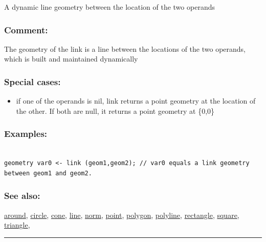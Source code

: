 \documentclass[]{book}
\providecommand{\tightlist}{%
  \setlength{\itemsep}{0pt}\setlength{\parskip}{0pt}}
\theoremstyle{definition}
\theoremstyle{definition}
\theoremstyle{definition}
\theoremstyle{remark}
\begin{document}
A dynamic line geometry between the location of the two operands

\subsubsection{Comment:}\label{comment-60}

The geometry of the link is a line between the locations of the two
operands, which is built and maintained dynamically

\subsubsection{Special cases:}\label{special-cases-89}

\begin{itemize}
\tightlist
\item
  if one of the operands is nil, link returns a point geometry at the
  location of the other. If both are null, it returns a point geometry
  at \{0,0\}
\end{itemize}

\subsubsection{Examples:}\label{examples-224}

\begin{verbatim}
 
geometry var0 <- link (geom1,geom2); // var0 equals a link geometry between geom1 and geom2.
\end{verbatim}

\subsubsection{See also:}\label{see-also-126}

\href{operators-a-to-a.html\#around}{around},
\href{operators-b-to-c.html\#circle}{circle},
\href{operators-b-to-c.html\#cone}{cone},
\href{operators-i-to-m.html\#line}{line},
\href{operators-n-to-r.html\#norm}{norm},
\href{operators-n-to-r.html\#point}{point},
\href{operators-n-to-r.html\#polygon}{polygon},
\href{operators-n-to-r.html\#polyline}{polyline},
\href{operators-n-to-r.html\#rectangle}{rectangle},
\href{operators-s-to-z.html\#square}{square},
\href{operators-s-to-z.html\#triangle}{triangle},

\begin{center}\rule{0.5\linewidth}{\linethickness}\end{center}
\end{document}
